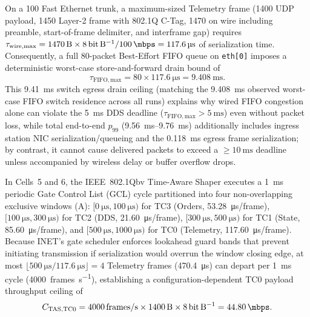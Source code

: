 \documentclass[11pt,a4paper]{article}
\begin{document}
On a \qty{100}{\mbps} Fast Ethernet trunk, a maximum-sized Telemetry frame (\qty{1400}{\byte} UDP payload, \qty{1450}{\byte} Layer-2 frame with 802.1Q C-Tag, \qty{1470}{\byte} on wire including preamble, start-of-frame delimiter, and interframe gap) requires $\tau_{\mathrm{wire,max}} = \qty{1470}{\byte} \times \qty{8}{\bit\per\byte} / \qty{100}{\mbps} = \qty{117.6}{\micro\second}$ of serialization time. Consequently, a full 80-packet Best-Effort FIFO queue on \texttt{eth[0]} imposes a deterministic worst-case store-and-forward drain bound of
\begin{equation}
\tau_{\mathrm{FIFO,max}} = 80 \times \qty{117.6}{\micro\second} = \qty{9.408}{\milli\second}.
\label{eq:fifo_drain}
\end{equation}
This \qty{9.41}{\milli\second} switch egress drain ceiling (matching the \qty{9.408}{\milli\second} observed worst-case FIFO switch residence across all runs) explains why wired FIFO congestion alone can violate the \qty{5}{\milli\second} DDS deadline ($\tau_{\mathrm{FIFO,max}} > \qty{5}{\milli\second}$) even without packet loss, while total end-to-end $p_{99}$ (\qtyrange{9.56}{9.76}{\milli\second}) additionally includes ingress station NIC serialization/queueing and the \qty{0.118}{\milli\second} egress frame serialization; by contrast, it cannot cause delivered packets to exceed a $\ge \qty{10}{\milli\second}$ deadline unless accompanied by wireless delay or buffer overflow drops.

In Cells~5 and 6, the IEEE~802.1Qbv Time-Aware Shaper executes a \qty{1}{\milli\second} periodic Gate Control List (GCL) cycle partitioned into four non-overlapping exclusive windows (A): $[\qty{0}{\micro\second}, \qty{100}{\micro\second})$ for TC3 (Orders, \qty{53.28}{\micro\second}/frame), $[\qty{100}{\micro\second}, \qty{300}{\micro\second})$ for TC2 (DDS, \qty{21.60}{\micro\second}/frame), $[\qty{300}{\micro\second}, \qty{500}{\micro\second})$ for TC1 (State, \qty{85.60}{\micro\second}/frame), and $[\qty{500}{\micro\second}, \qty{1000}{\micro\second})$ for TC0 (Telemetry, \qty{117.60}{\micro\second}/frame). Because INET's gate scheduler enforces lookahead guard bands that prevent initiating transmission if serialization would overrun the window closing edge, at most $\lfloor \qty{500}{\micro\second} / \qty{117.6}{\micro\second} \rfloor = 4$ Telemetry frames (\qty{470.4}{\micro\second}) can depart per \qty{1}{\milli\second} cycle (\qty{4000}{frames\per\second}), establishing a configuration-dependent TC0 payload throughput ceiling of
\begin{equation}
C_{\mathrm{TAS,TC0}} = \num{4000}\,\text{frames/s} \times \qty{1400}{\byte} \times \qty{8}{\bit\per\byte} = \qty{44.80}{\mbps}.
\label{eq:tas_cap}
\end{equation}
\end{document}
